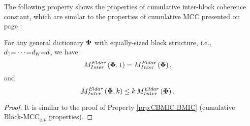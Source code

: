 The following property shows the properties of cumulative inter-block coherence constant, which are similar to the properties of cumulative MCC presented on page \pageref{txt:CMCC-properties}:
\begin{property}
\label{prp:CIIC-Eldar}
For any general dictionary $\boldsymbol{\Phi}$ with equally-sized block structure, i.e., $d_1 {=} \cdots {=} d_K {=} d$, we have:
\begin{equation*}
M_{Inter}^{Eldar}\left( \boldsymbol{\Phi} , 1 \right) = M_{Inter}^{Eldar}\left( \boldsymbol{\Phi} \right),
\end{equation*}
and
\begin{equation*}
M_{Inter}^{Eldar}\left( \boldsymbol{\Phi} , k \right) \leq k \, M_{Inter}^{Eldar}\left( \boldsymbol{\Phi} \right).
\end{equation*}
\end{property}
\begin{proof}
It is similar to the proof of Property \ref{prp:CBMIC-BMIC} (cumulative Block-MCC$_{q,p}$ properties).
\end{proof}